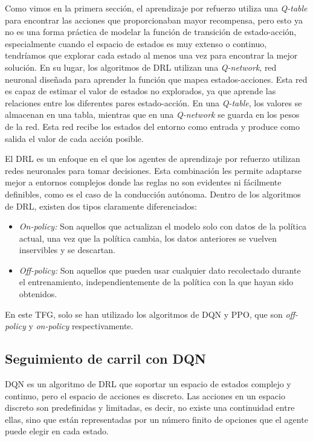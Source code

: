 Como vimos en la primera sección, el aprendizaje por refuerzo utiliza una \textit{Q-table} para encontrar las acciones que proporcionaban mayor recompensa, pero esto ya no es una forma práctica de modelar la función de transición de estado-acción, especialmente cuando el espacio de estados es muy extenso o continuo, tendríamos que explorar cada estado al menos una vez para encontrar la mejor solución. En su lugar, los algoritmos de \ac{DRL} utilizan una \textit{Q-network}, red neuronal diseñada para aprender la función que mapea estados-acciones. Esta red es capaz de estimar el valor de estados no explorados, ya que aprende las relaciones entre los diferentes pares estado-acción. En una \textit{Q-table}, los valores se almacenan en una tabla, mientras que en una \textit{Q-network} se guarda en los pesos de la red. Esta red recibe los estados del entorno como entrada y produce como salida el valor de cada acción posible. 

El \ac{DRL} es un enfoque en el que los agentes de aprendizaje por refuerzo utilizan redes neuronales para tomar decisiones. Esta combinación les permite adaptarse mejor a entornos complejos donde las reglas no son evidentes ni fácilmente definibles, como es el caso de la conducción autónoma. Dentro de los algoritmos de \ac{DRL}, existen dos tipos claramente diferenciados:

\begin{itemize}
		\item \textit{On-policy:} Son aquellos que actualizan el modelo solo con datos de la política actual, una vez que la política cambia, los datos anteriores se vuelven inservibles y se descartan.
		\item \textit{Off-policy:} Son aquellos que pueden usar cualquier dato recolectado durante el entrenamiento, independientemente de la política con la que hayan sido obtenidos.

\end{itemize}

En este \ac{TFG}, solo se han utilizado los algoritmos de \ac{DQN} y \ac{PPO}, que son \textit{off-policy} y \textit{on-policy} respectivamente\cite{drl}.

\subsection{Seguimiento de carril con \ac{DQN}}

\ac{DQN} es un algoritmo de \ac{DRL} que soportar un espacio de estados complejo y continuo, pero el espacio de acciones es discreto. Las acciones en un espacio discreto son predefinidas y limitadas, es decir, no existe una continuidad entre ellas, sino que están representadas por un número finito de opciones que el agente puede elegir en cada estado.

